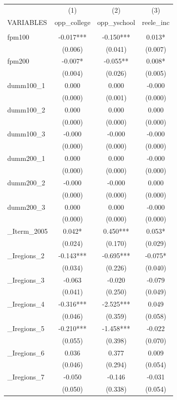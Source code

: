 \documentclass[]{article}
\begin{document}
\begin{tabular}{lccc} \hline
 & (1) & (2) & (3) \\
VARIABLES & opp\_college & opp\_yschool & reele\_inc \\ \hline
 &  &  &  \\
fpm100 & -0.017*** & -0.150*** & 0.013* \\
 & (0.006) & (0.041) & (0.007) \\
fpm200 & -0.007* & -0.055** & 0.008* \\
 & (0.004) & (0.026) & (0.005) \\
dumm100\_1 & 0.000 & 0.000 & -0.000 \\
 & (0.000) & (0.001) & (0.000) \\
dumm100\_2 & 0.000 & 0.000 & 0.000 \\
 & (0.000) & (0.000) & (0.000) \\
dumm100\_3 & -0.000 & -0.000 & -0.000 \\
 & (0.000) & (0.000) & (0.000) \\
dumm200\_1 & 0.000 & 0.000 & -0.000 \\
 & (0.000) & (0.000) & (0.000) \\
dumm200\_2 & -0.000 & -0.000 & 0.000 \\
 & (0.000) & (0.000) & (0.000) \\
dumm200\_3 & 0.000 & 0.000 & -0.000 \\
 & (0.000) & (0.000) & (0.000) \\
\_Iterm\_2005 & 0.042* & 0.450*** & 0.053* \\
 & (0.024) & (0.170) & (0.029) \\
\_Iregions\_2 & -0.143*** & -0.695*** & -0.075* \\
 & (0.034) & (0.226) & (0.040) \\
\_Iregions\_3 & -0.063 & -0.020 & -0.079 \\
 & (0.041) & (0.250) & (0.049) \\
\_Iregions\_4 & -0.316*** & -2.525*** & 0.049 \\
 & (0.046) & (0.359) & (0.058) \\
\_Iregions\_5 & -0.210*** & -1.458*** & -0.022 \\
 & (0.055) & (0.398) & (0.070) \\
\_Iregions\_6 & 0.036 & 0.377 & 0.009 \\
 & (0.046) & (0.294) & (0.054) \\
\_Iregions\_7 & -0.050 & -0.146 & -0.031 \\
 & (0.050) & (0.338) & (0.054) \\

\end{tabular}
\end{document}
